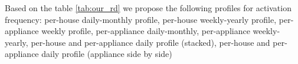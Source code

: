 Based on the table \ref{tab:our_rd} we propose the following profiles for activation frequency:
per-house daily-monthly profile,
per-house weekly-yearly profile,
per-appliance weekly profile,
per-appliance daily-monthly,
per-appliance weekly-yearly,
per-house and per-appliance daily profile (stacked),
per-house and per-appliance daily profile (appliance side by side)



